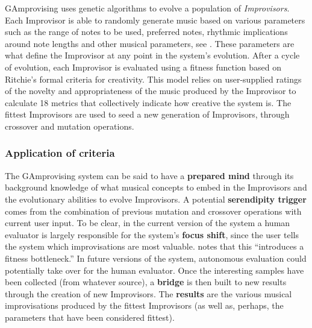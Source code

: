 {\sf GAmprovising} uses genetic algorithms to evolve a population of
\emph{Improvisors}. Each Improvisor is able to randomly generate music
based on various parameters such as the range of notes to be used,
preferred notes, rhythmic implications around note lengths and other
musical parameters, see \cite{jordanous10}. These parameters are what
define the Improvisor at any point in the system's evolution.  After a
cycle of evolution, each Improvisor is evaluated using a fitness
function based on Ritchie's \citeyear{ritchie07} formal criteria for
creativity.  This model relies on user-supplied ratings of the novelty
and appropriateness of the music produced by the Improvisor to
calculate 18 metrics that collectively indicate how creative the
system is.  The fittest Improvisors are used to seed a new generation
of Improvisors, through crossover and mutation operations.

\subsubsection{Application of criteria}

The {\sf GAmprovising} system can be said to have a \textbf{prepared
  mind} through its background knowledge of what musical concepts to
embed in the Improvisors and the evolutionary abilities to evolve
Improvisors. A potential \textbf{serendipity trigger} comes from the
combination of previous mutation and crossover operations with current
user input.  To be clear, in the current version of the system a human
evaluator is largely responsible for the system's \textbf{focus
  shift}, since the user tells the system which improvisations are
most valuable.   notes that this ``introduces a
fitness bottleneck.''  In future versions of the system, autonomous
evaluation could potentially take over for the human evaluator.  Once
the interesting samples have been collected (from whatever source), a
\textbf{bridge} is then built to new results through the creation of
new Improvisors.  The \textbf{results} are the various musical
improvisations produced by the fittest Improvisors (as well as,
perhaps, the parameters that have been considered fittest).

